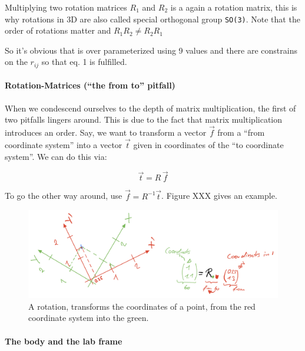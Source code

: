 \documentclass[
  letterpaper,
  DIV=11,
  numbers=noendperiod]{scrartcl}
\let\oldparagraph\paragraph
\renewcommand{\paragraph}[1]{\oldparagraph{#1}\mbox{}}
\begin{document}
Multiplying two rotation matrices \(R_1\) and \(R_2\) is a again a
rotation matrix, this is why rotations in 3D are also called special
orthogonal group \texttt{SO(3)}. Note that the order of rotations matter
and \(R_1 R_2 \ne R_2 R_1\)

So it's obvious that is over parameterized using 9 values and there are
constrains on the \(r_{ij}\) so that eq. 1 is fulfilled.

\hypertarget{rotation-matrices-the-from-to-pitfall}{%
\paragraph{Rotation-Matrices (``the from to''
pitfall)}\label{rotation-matrices-the-from-to-pitfall}}

When we condescend ourselves to the depth of matrix multiplication, the
first of two pitfalls lingers around. This is due to the fact that
matrix multiplication introduces an order. Say, we want to transform a
vector \(\vec{f}\) from a ``from coordinate system'' into a vector
\(\vec{t}\) given in coordinates of the ``to coordinate system''. We can
do this via:

\[
\vec{t}=R \,\vec{f}
\]

To go the other way around, use \(\vec{f}=R^{-1} \vec{t}\). Figure XXX
gives an example.

\begin{figure}

{\centering \includegraphics[width=10.41667in,height=\textheight]{images/from_to_in_2D.png}

}

\caption{\label{fig-fromto}A rotation, transforms the coordinates of a
point, from the red coordinate system into the green.}

\end{figure}

\hypertarget{the-body-and-the-lab-frame}{%
\paragraph{The body and the lab
frame}\label{the-body-and-the-lab-frame}}
\end{document}
